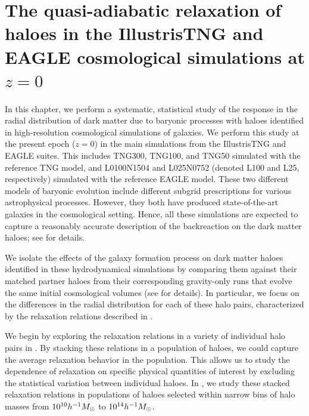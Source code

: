 \chapter[Modern realistic simulations - across a variety of haloes at present epoch]{The quasi-adiabatic relaxation of haloes in the IllustrisTNG and EAGLE cosmological simulations at $z=0$}
\label{chap:z0_main}

In this chapter, we perform a systematic, statistical study of the response in the radial distribution of dark matter due to baryonic processes with haloes identified in high-resolution cosmological simulations of galaxies. We perform this study at the present epoch (\(z=0\)) in the main simulations from the IllustrisTNG \citep[][]{2019ComAC...6....2N} and EAGLE \citep[][]{2017arXiv170609899T} suites. This includes TNG300, TNG100, and TNG50 simulated with the reference TNG model, and L0100N1504 and L025N0752 (denoted L100 and L25, respectively) simulated with the reference EAGLE model. These two different models of baryonic evolution include different subgrid prescriptions for various astrophysical processes. However, they both have produced state-of-the-art galaxies in the cosmological setting. Hence, all these simulations are expected to capture a reasonably accurate description of the backreaction on the dark matter haloes; see  for details.

We isolate the effects of the galaxy formation process on dark matter haloes identified in these hydrodynamical simulations by comparing them against their matched partner haloes from their corresponding gravity-only runs that evolve the same initial cosmological volumes (see  for details). In particular, we focus on the differences in the radial distribution for each of these halo pairs, characterized by the relaxation relations described in .

We begin by exploring the relaxation relations in a variety of individual halo pairs in . By stacking these relations in a population of haloes, we could capture the average relaxation behavior in the population. This allows us to study the dependence of relaxation on specific physical quantities of interest by excluding the statistical variation between individual haloes. In , we study these stacked relaxation relations in populations of haloes selected within narrow bins of halo masses from $10^{10} h^{-1}M_{\odot}$ to $10^{14} h^{-1}M_{\odot}$.

